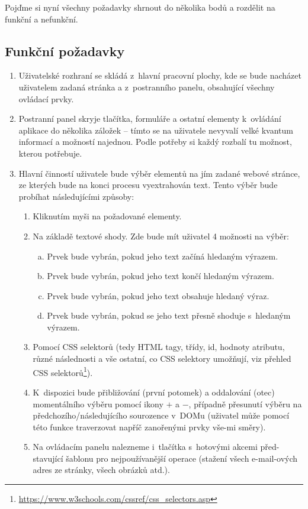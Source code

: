 \documentclass[thesis=B,czech]{FITthesis}[2012/06/26]
\begin{document}
Pojďme si nyní všechny požadavky shrnout do několika bodů a rozdělit na funkční a nefunkční.

\subsection{Funkční požadavky}
\begin{enumerate}[F1)]
	\item Uživatelské rozhraní se skládá z~hlavní pracovní plochy, kde se bude nacházet uživatelem zadaná stránka a z~postranního panelu, obsahující všechny ovládací prvky.
	\item Postranní panel skryje tlačítka, formuláře a ostatní elementy k~ovládání aplikace do několika záložek -- tímto se na uživatele nevyvalí velké kvantum informací a možností najednou. Podle potřeby si každý rozbalí tu možnost, kterou potřebuje.
	\item Hlavní činností uživatele bude výběr elementů na jím zadané webové stránce, ze kterých bude na konci procesu vyextrahován text. Tento výběr bude probíhat následujícími způsoby:
	\begin{enumerate}[F3.1)]
		\item Kliknutím myši na požadované elementy.
		\item Na základě textové shody. Zde bude mít uživatel 4 možnosti na výběr:
		\begin{enumerate}[a)]
			\item Prvek bude vybrán, pokud jeho text začíná hledaným výrazem.
			\item Prvek bude vybrán, pokud jeho text končí hledaným výrazem.
			\item Prvek bude vybrán, pokud jeho text obsahuje hledaný výraz.
			\item Prvek bude vybrán, pokud se jeho text přesně shoduje s~hledaným výrazem.
		\end{enumerate}
		\item Pomocí CSS selektorů (tedy HTML tagy, třídy, id, hodnoty atributu, různé následnosti a vše ostatní, co CSS selektory umožňují, viz přehled CSS selektorů\footnote{\url{https://www.w3schools.com/cssref/css_selectors.asp}}).
		\item K~dispozici bude přibližování (první potomek) a oddalování (otec) momentálního výběru pomocí ikony $+$ a $-$, případně přesunutí výběru na předchozího/následujícího sourozence v~DOMu (uživatel může pomocí této funkce traverzovat napříč zanořenými prvky vše-mi směry).
		\item Na ovládacím panelu nalezneme i~tlačítka s~hotovými akcemi před-stavující šablonu pro nejpoužívanější operace (stažení všech e-mail-ových adres ze stránky, všech obrázků atd.).

\end{enumerate}
\end{enumerate}
\end{document}
